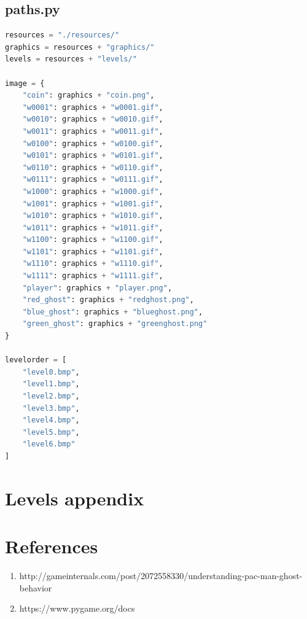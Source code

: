 \documentclass[11pt,a4paper]{report}
\begin{document}
		\section{paths.py}
			\begin{lstlisting}[language = Python]
resources = "./resources/"
graphics = resources + "graphics/"
levels = resources + "levels/"

image = {
	"coin": graphics + "coin.png",
	"w0001": graphics + "w0001.gif",
	"w0010": graphics + "w0010.gif",
	"w0011": graphics + "w0011.gif",
	"w0100": graphics + "w0100.gif",
	"w0101": graphics + "w0101.gif",
	"w0110": graphics + "w0110.gif",
	"w0111": graphics + "w0111.gif",
	"w1000": graphics + "w1000.gif",
	"w1001": graphics + "w1001.gif",
	"w1010": graphics + "w1010.gif",
	"w1011": graphics + "w1011.gif",
	"w1100": graphics + "w1100.gif",
	"w1101": graphics + "w1101.gif",
	"w1110": graphics + "w1110.gif",
	"w1111": graphics + "w1111.gif",
	"player": graphics + "player.png",
	"red_ghost": graphics + "redghost.png",
	"blue_ghost": graphics + "blueghost.png",
	"green_ghost": graphics + "greenghost.png"
}

levelorder = [
	"level0.bmp",
	"level1.bmp",
	"level2.bmp",
	"level3.bmp",
	"level4.bmp",
	"level5.bmp",
	"level6.bmp"
]
			\end{lstlisting}
	\chapter{Levels appendix}
			
	\chapter{References}
		\begin{enumerate}
			\item
				http://gameinternals.com/post/2072558330/understanding-pac-man-ghost-behavior
				\label{stronaopacmanie}
			\item
				https://www.pygame.org/docs
				\label{pygamedocs}
		\end{enumerate}
			
\end{document}
